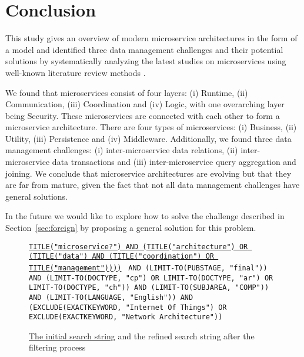 \section{Conclusion}\label{sec:conclusion}
This study gives an overview of modern microservice architectures in the form of a model and identified three data management challenges and their potential solutions by systematically analyzing the latest studies on microservices using well-known literature review methods \cite{syslit1, syslit2,syslit3,syslit4}.

We found that microservices consist of four layers: (i) Runtime, (ii) Communication, (iii) Coordination and (iv) Logic, with one overarching layer being Security. These microservices are connected with each other to form a microservice architecture. There are four types of microservices: (i) Business, (ii) Utility, (iii) Persistence and (iv) Middleware. Additionally, we found three data management challenges: (i) inter-microservice data relations, (ii) inter-microservice data transactions and (iii) inter-microservice query aggregation and joining. We conclude that microservice architectures are evolving but that they are far from mature, given the fact that not all data management challenges have general solutions.

In the future we would like to explore how to solve the challenge described in Section~\ref{sec:foreign} by proposing a general solution for this problem.







\begin{figure}
    \ul{\texttt{TITLE("microservice?") AND (TITLE("architecture") OR (TITLE("data") AND (TITLE("coordination") OR TITLE("management"))))}} \texttt{ AND (LIMIT-TO(PUBSTAGE, "final")) AND (LIMIT-TO(DOCTYPE, "cp") OR LIMIT-TO(DOCTYPE, "ar") OR LIMIT-TO(DOCTYPE, "ch")) AND (LIMIT-TO(SUBJAREA, "COMP")) AND (LIMIT-TO(LANGUAGE, "English")) AND (EXCLUDE(EXACTKEYWORD, "Internet Of Things") OR EXCLUDE(EXACTKEYWORD, "Network Architecture"))}
    \caption{\ul{The initial search string} and the refined search string after the filtering process}
    \label{fig:search-string-refined}
\end{figure}



